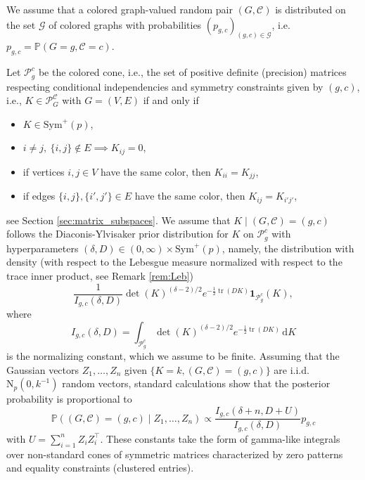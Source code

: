 \documentclass[12pt]{amsart}
\theoremstyle{plain}
\theoremstyle{definition}
\theoremstyle{remark}
\renewcommand{\P}{\mathbb{P}}
\newcommand{\1}{\mathbf{1}}
\newcommand{\dd}{\mathrm{d}}
\newcommand{\tr}{\operatorname{tr}}
\begin{document}
We assume that a colored graph-valued random pair $(G,\mathcal{C})$ is distributed on the set $\mathcal{G}$ of colored graphs with probabilities $(p_{g,c})_{(g,c)\in\mathcal{G}}$, i.e.  $p_{g,c}=\P(G=g,\mathcal{C}=c)$. 

Let $\mathcal{P}_g^c$ be the colored cone, i.e., the set of positive definite (precision) matrices respecting conditional independencies and symmetry constraints given by $(g,c)$, i.e., $K\in \mathcal{P}_G^{\mathcal{C}}$ with $G=(V,E)$ if and only if
\begin{itemize}
    \item $K\in\mathrm{Sym}^+(p)$,
    \item $i\ne j,\ \{i,j\}\notin E \implies K_{ij}=0$,
    \item if vertices $i,j\in V$ have the same color, then $K_{ii}=K_{jj}$,
    \item if edges $\{i,j\}, \{i',j'\}\in E$ have the same color, then $K_{ij}=K_{i'j'}$,
\end{itemize}
see Section \ref{sec:matrix_subspaces}.
We assume that $K\mid (G,\mathcal{C})=(g,c)$ follows the Diaconis-Ylvisaker prior distribution for $K$ on $\mathcal{P}_g^c$ with hyperparameters $(\delta,D)\in(0,\infty)\times\mathrm{Sym}^+(p)$, namely, the distribution with density (with respect to the Lebesgue measure normalized with respect to the trace inner product, see Remark \ref{rem:Leb}) 
\[
\frac{1}{I_{g,c}(\delta,D)}\det(K)^{(\delta-2)/2}e^{-\frac12\tr(D K)} \1_{\mathcal{P}_g^c}(K),
\]
where
\[
I_{g,c}(\delta,D)
=\int_{\mathcal{P}_g^c}
\det(K)^{(\delta-2)/2}e^{-\frac12\tr(DK)}\,\dd K
\]
is the normalizing constant, which we assume to be finite.
Assuming that the Gaussian vectors $Z_1,\ldots,Z_n$ given $\{K=k, (G,\mathcal{C})=(g,c)\}$ are i.i.d. $\mathrm{N}_{p}(0,k^{-1})$ random vectors, standard calculations show that the posterior probability is proportional to
\begin{equation}\label{eq:posterior-model-probability}
\P((G,\mathcal{C})=(g,c)\mid Z_1,\ldots,Z_n) \propto \frac{I_{g,c}(\delta+n,D+U)}{I_{g,c}(\delta,D)} p_{g,c}
\end{equation}
with $U=\sum_{i=1}^n Z_i Z_i^\top$.  
These constants take the form of gamma-like integrals over non-standard cones of symmetric matrices characterized by zero patterns and equality constraints (clustered entries).
\end{document}
